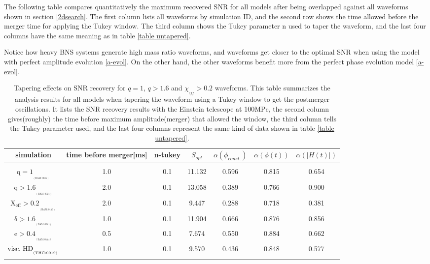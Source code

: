 The following table compares quantitatively the maximum recovered SNR for all models after being overlapped against all waveforms shown in section \ref{2dsearch}. The first column lists all waveforms by simulation ID, and the second row shows the time allowed before the merger time for applying the Tukey window. The third column shows the Tukey parameter n used to taper the waveform, and the last four columns have the same meaning as in table \ref{table untapered}.


Notice how heavy BNS systems generate high mass ratio waveforms, and waveforms get closer to the optimal SNR when using the model with perfect amplitude evolution \ref{a-evol}. On the other hand, the other waveforms benefit more from the perfect phase evolution model \ref{a-evol}.

\begin{table}[!htbp]
\begin{center}

\begin{tabular}{ccccccc}
simulation&time before merger[ms]&n-tukey&$S_{opt}$&$\alpha(\phi_{const.})$&$\alpha(\phi(t))$&$\alpha(|H(t)|)$\\ 
\hline\\ 
$\mathrm{{q=1}_{_{_{(BAM:0035)}}}}$&1.0&0.1&11.132&0.596&0.815&0.654\\  
$\mathrm{{q>1.6}_{_{_{(BAM:0021)}}}}$&2.0&0.1&13.058&0.389&0.766&0.900\\  
$\mathrm{{X_{eff}>0.2}_{_{_{(BAM:0110)}}}}$&2.0&0.1&9.447&0.288&0.718&0.381\\  
$\mathrm{{\delta>1.6}_{_{_{(BAM:0011)}}}}$&1.0&0.1&11.904&0.666&0.876&0.856\\  
$\mathrm{{e>0.4}_{_{_{(BAM:0114)}}}}$&0.5&0.1&7.674&0.550&0.884&0.662\\  
$\mathrm{{visc.\hspace{1mm} HD}_{_{_{(THC:0019)}}}}$&1.0&0.1&9.570&0.436&0.848&0.577\\  
\hline\\ 
\end{tabular}
\captionsetup{width=0.8\textwidth}
\caption[Tapering effects on SNR recovery for $q=1$, $q>1.6$ and $\chi_{_{eff}}>0.2$ waveforms]{Tapering effects on SNR recovery for $q=1$, $q>1.6$ and $\chi_{_{eff}}>0.2$ waveforms. This table summarizes the analysis results for all models when tapering the waveform using a Tukey window to get the postmerger oscillations. It lists the  SNR  recovery results with the Einstein telescope at 100MPc, the second column gives(roughly) the time before maximum amplitude(merger) that allowed the window,  the third column tells the Tukey parameter used, and the last four columns represent the same kind of data shown in table \ref{table untapered}.}
\end{center}
\end{table}
\FloatBarrier






